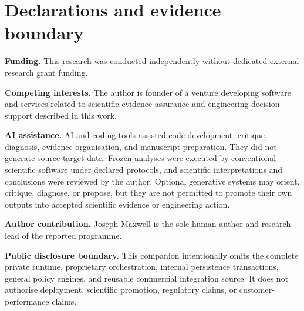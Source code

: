 \documentclass[9pt,a4paper]{article}
\begin{document}
\section*{Declarations and evidence boundary}
\textbf{Funding.} This research was conducted independently without dedicated external research grant funding.

\textbf{Competing interests.} The author is founder of a venture developing software and services related to scientific evidence assurance and engineering decision support described in this work.

\textbf{AI assistance.} AI and coding tools assisted code development, critique, diagnosis, evidence organisation, and manuscript preparation. They did not generate source target data. Frozen analyses were executed by conventional scientific software under declared protocols, and scientific interpretations and conclusions were reviewed by the author. Optional generative systems may orient, critique, diagnose, or propose, but they are not permitted to promote their own outputs into accepted scientific evidence or engineering action.

\textbf{Author contribution.} Joseph Maxwell is the sole human author and research lead of the reported programme.

\textbf{Public disclosure boundary.} This companion intentionally omits the complete private runtime, proprietary orchestration, internal persistence transactions, general policy engines, and reusable commercial integration source. It does not authorise deployment, scientific promotion, regulatory claims, or customer-performance claims.
\end{document}
